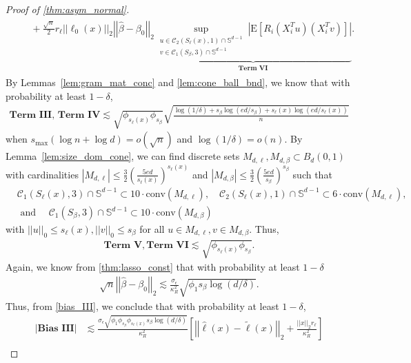 \documentclass[ejsv2,noshowframe]{imsart}
\theoremstyle{plain}
\theoremstyle{definition}
\theoremstyle{remark}
\newcommand{\norm}[1]{\left|\left| #1 \right|\right|}
\renewcommand{\hat}{\widehat}
\renewcommand{\tilde}{\widetilde}
\begin{document}
\begin{proof}[Proof of \autoref{thm:asym_normal}]
\begin{align}
\begin{split}
			&\quad + \frac{\sqrt{n}}{2} r_{\ell}\norm{\ell_0(x)}_2 \norm{\hat{\beta}-\beta_0}_2 \underbrace{\sup_{\substack{u\in \mathcal{C}_2(S_{\ell}(x),1) \cap \mathbb{S}^{d-1}\\v\in \mathcal{C}_1(S_{\beta},3) \cap \mathbb{S}^{d-1}}} \left|\mathrm{E}\left[R_i(X_i^Tu) (X_i^Tv)\right]\right|}_{\textbf{Term VI}}.
		\end{split}
	\end{align}
	By Lemmas~\ref{lem:gram_mat_conc} and \ref{lem:cone_ball_bnd}, we know that with probability at least $1-\delta$,
	\begin{align*}
		\textbf{Term III},\, \textbf{Term IV} \lesssim \sqrt{\phi_{s_{\ell}(x)} \phi_{s_{\beta}}} \sqrt{\frac{\log(1/\delta) + s_{\beta}\log(ed/s_{\beta}) + s_{\ell}(x) \log(ed/s_{\ell}(x))}{n}}
	\end{align*}
	when $s_{\max}\left(\log n + \log d\right) = o(\sqrt{n})$ and $\log(1/\delta) = o(n)$. By Lemma~\ref{lem:size_dom_cone}, we can find discrete sets $M_{d,\ell}, M_{d,\beta} \subset B_d(0,1)$ with cardinalities $|M_{d,\ell}|\leq \frac{3}{2}\left(\frac{5ed}{s_{\ell}(x)}\right)^{s_{\ell}(x)}$ and $|M_{d,\beta}|\leq \frac{3}{2}\left(\frac{5ed}{s_{\beta}}\right)^{s_{\beta}}$ such that 
	\begin{align*}
		&\mathcal{C}_1(S_{\ell}(x),3) \cap \mathbb{S}^{d-1} \subset 10 \cdot \mathrm{conv}(M_{d,\ell}), \quad \mathcal{C}_2(S_{\ell}(x),1) \cap \mathbb{S}^{d-1} \subset 6 \cdot \mathrm{conv}(M_{d,\ell}),\\
		& \text{ and } \quad  \mathcal{C}_1(S_{\beta},3) \cap \mathbb{S}^{d-1} \subset 10\cdot \mathrm{conv}(M_{d,\beta})
	\end{align*}
	with $\norm{u}_0\leq s_{\ell}(x), \norm{v}_0\leq s_{\beta}$ for all $u\in M_{d,\ell}, v\in M_{d,\beta}$. Thus, 
	\begin{align*}
		\textbf{Term V}, \textbf{Term VI} \lesssim \sqrt{\phi_{s_{\ell}(x)} \phi_{s_{\beta}}}.
	\end{align*}
	Again, we know from \autoref{thm:lasso_const} that with probability at least $1-\delta$
	\begin{align*}
		\sqrt{n}\norm{\hat{\beta}-\beta_0}_2 \lesssim \frac{\sigma_{\epsilon}}{\kappa_R^2} \sqrt{\phi_1s_{\beta}\log(d/\delta)}.
	\end{align*}
	Thus, from \eqref{bias_III}, we conclude that with probability at least $1-\delta$,
	\begin{align*}
		\left|\textbf{Bias III}\right| 
		&\lesssim \frac{\sigma_{\epsilon}\sqrt{\phi_1 \phi_{s_{\beta}} \phi_{s_{\ell}(x)} s_{\beta}\log(d/\delta)}}{\kappa_R^2} \left[\norm{\hat{\ell}(x) -\tilde{\ell}(x)}_2 + \frac{\norm{x}_2 r_{\ell}}{\kappa_R^2} \right] \\

\end{align*}
\end{proof}
\end{document}
